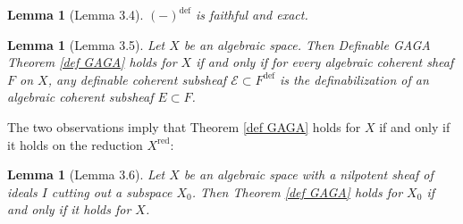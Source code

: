 \documentclass{amsart}
\newtheorem{lemma}[theorem]{Lemma}
\theoremstyle{definition}
\numberwithin{equation}{section}
\newcommand{\definable}{\mathrm{def}}
\begin{document}
\begin{lemma}[Lemma 3.4]
	$(-)^{\definable}$ is faithful and exact.
\end{lemma}

\begin{lemma}[Lemma 3.5]
	\label{Lemma 3.5}
	Let $X$ be an algebraic space.
	Then Definable GAGA Theorem \ref{def GAGA} holds for $X$ if and only if
	for every algebraic coherent sheaf $F$ on $X$,
	any definable coherent subsheaf $\mathcal{E} \subset F^{\definable}$ is the definabilization of
	an algebraic coherent subsheaf $E \subset F$.
\end{lemma}

The two observations imply that Theorem \ref{def GAGA} holds for $X$
if and only if it holds on the reduction $X^{\mathrm{red}}$:
\begin{lemma}[Lemma 3.6]
	\label{Lemma 3.6}
	Let $X$ be an algebraic space with a nilpotent sheaf of ideals $I$ cutting out a subspace $X_0$.
	Then Theorem \ref{def GAGA} holds for $X_0$ if and only if it holds for $X$.
\end{lemma}
\end{document}
